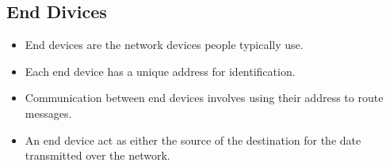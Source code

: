 \documentclass[a4paper,11pt]{article}
\begin{document}
\subsection{End Divices}
\begin{itemize}
    \item End devices are the network devices people typically use.\\
    \item Each end device  has a unique address for identification.\\
    \item Communication between end devices involves using their address to route messages.\\
    \item An end device act as either the source of the destination for the date transmitted over the network.\\
\end{itemize}
\end{document}
